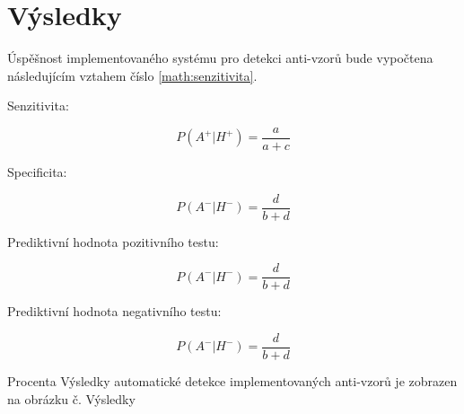 \documentclass[czech,DP]{thesiskiv}
\begin{document}
\section{Výsledky}
Úspěšnost implementovaného systému pro detekci anti-vzorů bude vypočtena následujícím vztahem číslo \ref{math:senzitivita}.
\begin{center}
    \label{math:senzitivita}
    \caption{Senzitivita:}
    \begin{equation}
        P(A^{+}|H^{+}) = \frac{a}{a+c}
    \end{equation}
\end{center}
\begin{center}
    \label{math:specificita}
    \caption{Specificita:}
    \begin{equation}
        P(A^{-}|H^{-}) = \frac{d}{b+d}
    \end{equation}
\end{center}
\begin{center}
    \label{math:prediktivní_pozitivní}
    \caption{Prediktivní hodnota pozitivního testu:}
    \begin{equation}
        P(A^{-}|H^{-}) = \frac{d}{b+d}
    \end{equation}
\end{center}
\begin{center}
    \label{math:prediktivní_negativní}
    \caption{Prediktivní hodnota negativního testu:}
    \begin{equation}
        P(A^{-}|H^{-}) = \frac{d}{b+d}
    \end{equation}
\end{center}
Procenta
Výsledky automatické detekce implementovaných anti-vzorů je zobrazen na obrázku č. Výsledky 
\end{document}
